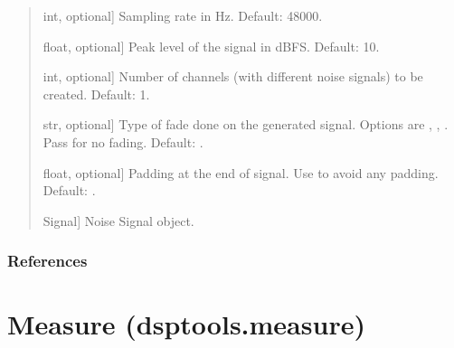 \documentclass[letterpaper,10pt,english]{sphinxmanual}
\begin{document}
\begin{fulllineitems}
\begin{quote}
\begin{description}
\begin{description}
\sphinxlineitem{\sphinxstylestrong{sampling\_rate\_hz}}{[}int, optional{]}
\sphinxAtStartPar
Sampling rate in Hz. Default: 48000.

\sphinxlineitem{\sphinxstylestrong{peak\_level\_dbfs}}{[}float, optional{]}
\sphinxAtStartPar
Peak level of the signal in dBFS. Default: \sphinxhyphen{}10.

\sphinxlineitem{\sphinxstylestrong{number\_of\_channels}}{[}int, optional{]}
\sphinxAtStartPar
Number of channels (with different noise signals) to be created.
Default: 1.

\sphinxlineitem{\sphinxstylestrong{fade}}{[}str, optional{]}
\sphinxAtStartPar
Type of fade done on the generated signal. Options are ,
, . Pass  for no fading. Default: .

\sphinxlineitem{\sphinxstylestrong{padding\_end\_seconds}}{[}float, optional{]}
\sphinxAtStartPar
Padding at the end of signal. Use  to avoid any padding.
Default: .

\end{description}

\begin{description}
\sphinxlineitem{\sphinxstylestrong{noise\_sig}}{[}Signal{]}
\sphinxAtStartPar
Noise Signal object.

\end{description}

\end{description}\end{quote}
\subsubsection*{References}

\sphinxAtStartPar
{}

\end{fulllineitems}


\sphinxstepscope


\section{Measure (dsptools.measure)}
\label{\detokenize{modules/dsptools.measure:module-dsptools.measure}}\label{\detokenize{modules/dsptools.measure:measure-dsptools-measure}}\label{\detokenize{modules/dsptools.measure::doc}}
\end{document}
